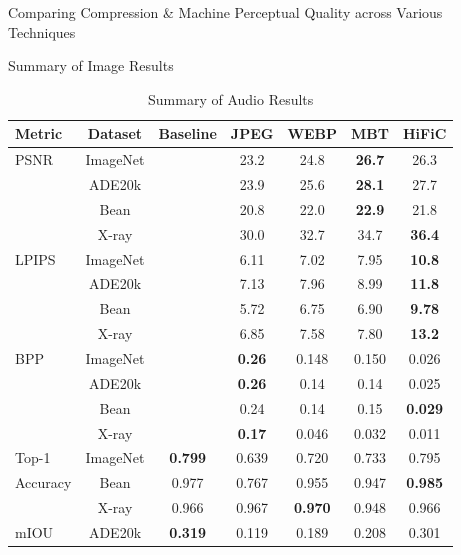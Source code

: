 \documentclass[10pt,twocolumn,letterpaper]{article}
\begin{document}
\begin{table}[!htb]
    \caption{Comparing Compression \& Machine Perceptual Quality across Various Techniques}
    \label{tab:compression_comparison}
        \begin{subtable}{.6\linewidth}
      \centering
        \caption{Summary of Image Results}
        \label{tab:image_compression_comparison}
        \setlength{\tabcolsep}{3pt}
        {\small\begin{tabular}{lcccccc}
\toprule
Metric & Dataset & Baseline & JPEG & WEBP & MBT & HiFiC \\
\midrule
PSNR & ImageNet &  & 23.2 & 24.8 & \textbf{26.7} & 26.3 \\
     & ADE20k &  & 23.9 & 25.6 & \textbf{28.1} & 27.7 \\
     & Bean &  & 20.8 & 22.0 & \textbf{22.9} & 21.8 \\
     & X-ray &  & 30.0 & 32.7 & 34.7 & \textbf{36.4} \\
\midrule
LPIPS & ImageNet &  & 6.11 & 7.02 & 7.95 & \textbf{10.8} \\
      & ADE20k &  & 7.13 & 7.96 & 8.99 & \textbf{11.8 }\\
      & Bean &  & 5.72 & 6.75 & 6.90 & \textbf{9.78} \\
      & X-ray &  & 6.85 & 7.58 & 7.80 & \textbf{13.2} \\
\midrule
BPP & ImageNet &  & \textbf{0.26} & 0.148 & 0.150 & 0.026 \\
    & ADE20k &  & \textbf{0.26} & 0.14 & 0.14 & 0.025 \\
    & Bean &  & 0.24 & 0.14 & 0.15 & \textbf{0.029} \\
    & X-ray &  & \textbf{0.17} & 0.046 & 0.032 & 0.011 \\
\midrule
Top-1 & ImageNet & \textbf{0.799} & 0.639 & 0.720 & 0.733 & 0.795 \\
 Accuracy                        & Bean & 0.977 & 0.767 & 0.955 & 0.947 &\textbf{ 0.985} \\
                        & X-ray & 0.966 & 0.967 & \textbf{0.970} & 0.948 & 0.966 \\
\midrule
mIOU & ADE20k & \textbf{0.319} & 0.119 & 0.189 & 0.208 & 0.301 \\
\bottomrule
\end{tabular}}
    \end{subtable} 
    \begin{subtable}{.4\linewidth}
      \centering
        \caption{Summary of Audio Results}
        \label{tab:audio_compression_comparison}

\end{subtable}
\end{table}
\end{document}
